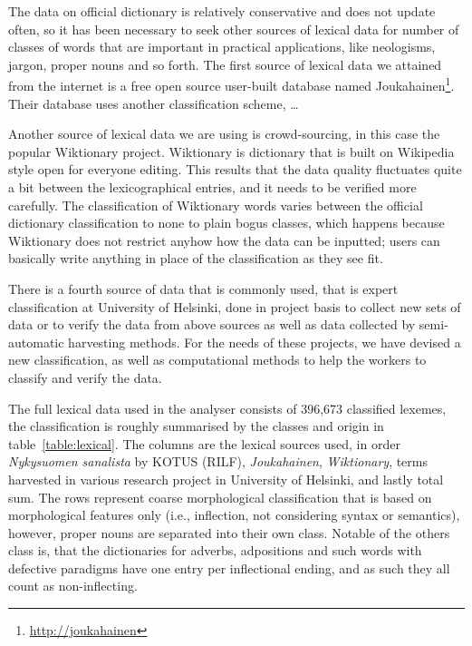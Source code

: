\documentclass[a4paper,12pt]{article}
\begin{document}
The data on official dictionary is relatively conservative and does not update
often, so it has been necessary to seek other sources of lexical data for number
of classes of words that are important in practical applications, like
neologisms, jargon, proper nouns and so forth. The first source of lexical data
we attained from the internet is a free open source user-built database named
Joukahainen\footnote{\url{http://joukahainen}}. Their database uses another
classification scheme, \ldots

Another source of lexical data we are using is crowd-sourcing, in this case the
popular Wiktionary project. Wiktionary is dictionary that is built on Wikipedia
style open for everyone editing. This results that the data quality fluctuates
quite a bit between the lexicographical entries, and it needs to be verified
more carefully. The classification of Wiktionary words varies between the
official dictionary classification to none to plain bogus classes, which happens
because Wiktionary does not restrict anyhow how the data can be inputted; users
can basically write anything in place of the classification as they see fit.

There is a fourth source of data that is commonly used, that is expert
classification at University of Helsinki, done in project basis to collect
new sets of data or to verify the data from above sources as well as data
collected by semi-automatic harvesting methods. For the needs of
these projects, we have devised a new classification, as well as computational
methods to help the workers to classify and verify the data.

The full lexical data used in the analyser consists of 396,673 classified
lexemes, the classification is roughly summarised by the classes and origin in
table~\ref{table:lexical}. The columns are the lexical sources used, in order
\emph{Nykysuomen sanalista} by KOTUS (RILF), \emph{Joukahainen}, 
\emph{Wiktionary}, terms harvested in various research project in University of
Helsinki, and lastly total sum. The rows represent coarse morphological
classification that is based on morphological features only (i.e., inflection,
not considering syntax or semantics), however, proper nouns are separated into
their own class. Notable of the others class is, that the dictionaries for
adverbs, adpositions and such words with defective paradigms have one entry per
inflectional ending, and as such they all count as non-inflecting.
\end{document}

